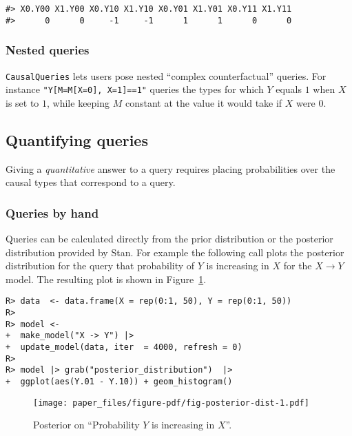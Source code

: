 \documentclass[
  11pt,
  article]{jss}
\begin{document}
\begin{verbatim}
#> X0.Y00 X1.Y00 X0.Y10 X1.Y10 X0.Y01 X1.Y01 X0.Y11 X1.Y11 
#>      0      0     -1     -1      1      1      0      0
\end{verbatim}

\hypertarget{nested-queries}{%
\subsubsection{Nested queries}\label{nested-queries}}

\texttt{CausalQueries} lets users pose nested ``complex counterfactual''
queries. For instance \texttt{"Y{[}M=M{[}X=0{]},\ X=1{]}==1"} queries
the types for which \(Y\) equals \(1\) when \(X\) is set to \(1\), while
keeping \(M\) constant at the value it would take if \(X\) were \(0\).

\hypertarget{quantifying-queries}{%
\subsection{Quantifying queries}\label{quantifying-queries}}

Giving a \emph{quantitative} answer to a query requires placing
probabilities over the causal types that correspond to a query.

\hypertarget{queries-by-hand}{%
\subsubsection{Queries by hand}\label{queries-by-hand}}

Queries can be calculated directly from the prior distribution or the
posterior distribution provided by Stan. For example the following call
plots the posterior distribution for the query that probability of \(Y\)
is increasing in \(X\) for the \(X \rightarrow Y\) model. The resulting
plot is shown in Figure~\ref{fig-posterior-dist}.

\begin{verbatim}
R> data  <- data.frame(X = rep(0:1, 50), Y = rep(0:1, 50))
R> 
R> model <- 
+  make_model("X -> Y") |>
+  update_model(data, iter  = 4000, refresh = 0)
R> 
R> model |> grab("posterior_distribution")  |> 
+  ggplot(aes(Y.01 - Y.10)) + geom_histogram() 
\end{verbatim}

\begin{figure}[t]

{\centering \texttt{[image: paper\_files/figure-pdf/fig-posterior-dist-1.pdf]}

}

\caption{\label{fig-posterior-dist}Posterior on ``Probability \(Y\) is
increasing in \(X\)''.}

\end{figure}
\end{document}
